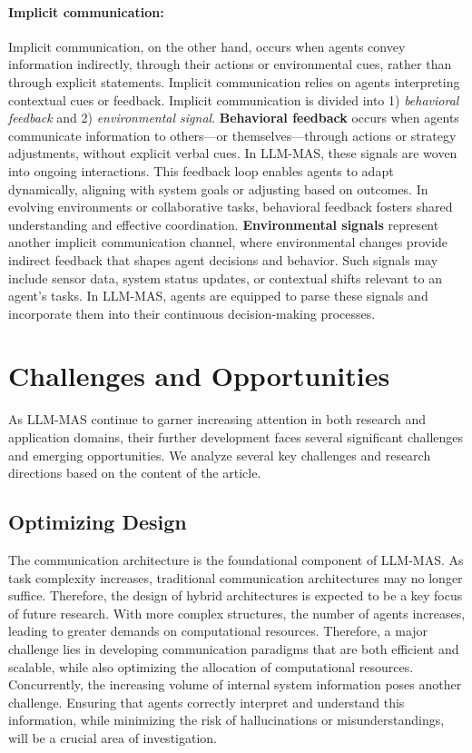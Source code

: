 \paragraph{Implicit communication:}Implicit communication, on the other hand, occurs when agents convey information indirectly, through their actions or environmental cues, rather than through explicit statements. Implicit communication relies on agents interpreting contextual cues or feedback. Implicit communication is divided into 1) \textit{behavioral feedback} and 2) \textit{environmental signal}. \textbf{Behavioral feedback} occurs when agents communicate information to others—or themselves—through actions or strategy adjustments, without explicit verbal cues. In LLM-MAS, these signals are woven into ongoing interactions. This feedback loop enables agents to adapt dynamically, aligning with system goals or adjusting based on outcomes. In evolving environments or collaborative tasks, behavioral feedback fosters shared understanding and effective coordination. \textbf{Environmental signals} represent another implicit communication channel, where environmental changes provide indirect feedback that shapes agent decisions and behavior. Such signals may include sensor data, system status updates, or contextual shifts relevant to an agent’s tasks. In LLM-MAS, agents are equipped to parse these signals and incorporate them into their continuous decision-making processes.

\section{Challenges and Opportunities}
As LLM-MAS continue to garner increasing attention in both research and application domains, their further development faces several significant challenges and emerging opportunities. We analyze several key challenges and research directions based on the content of the article.
\subsection{Optimizing Design}
The communication architecture is the foundational component of LLM-MAS. As task complexity increases, traditional communication architectures may no longer suffice. Therefore, the design of hybrid architectures is expected to be a key focus of future research. With more complex structures, the number of agents increases, leading to greater demands on computational resources. Therefore, a major challenge lies in developing communication paradigms that are both efficient and scalable, while also optimizing the allocation of computational resources. Concurrently, the increasing volume of internal system information poses another challenge. Ensuring that agents correctly interpret and understand this information, while minimizing the risk of hallucinations or misunderstandings, will be a crucial area of investigation.
